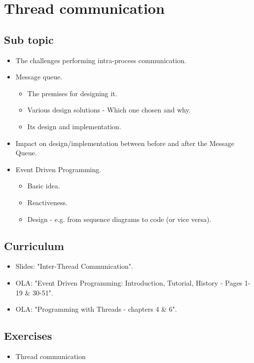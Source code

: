 \section{Thread communication}

\subsection{Sub topic}

\begin{itemize}
	\item The challenges performing intra-process communication.
	\item Message queue.
	\begin{itemize}
		\item The premises for designing it.
		\item Various design solutions - Which one chosen and why.
		\item Its design and implementation.
	\end{itemize}	
	\item Impact on design/implementation between before and after the Message Queue.
	\item Event Driven Programming.
	\begin{itemize}
		\item Basic idea.
		\item Reactiveness.
		\item Design - e.g. from sequence diagrams to code (or vice versa).
	\end{itemize}
\end{itemize}

\subsection{Curriculum}

\begin{itemize}
	\item Slides: "Inter-Thread Communication".
	\item OLA: "Event Driven Programming: Introduction, Tutorial, History - Pages 1-19 \& 30-51".
	\item OLA: "Programming with Threads - chapters 4 \& 6".
\end{itemize}

\subsection{Exercises}

\begin{itemize}
	\item Thread communication
\end{itemize}


